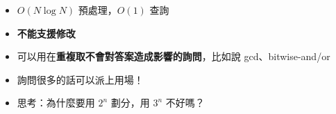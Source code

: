 \documentclass[standalone]{beamer}
\begin{document}
\begin{frame}[fragile]{}
  \begin{itemize}
    \item $O(N \log N)$ 預處理，$O(1)$ 查詢
    \item \textbf{不能支援修改}
    \item 可以用在\textbf{重複取不會對答案造成影響的詢問}，比如說 gcd、bitwise-and/or
    \item 詢問很多的話可以派上用場！
    \item 思考：為什麼要用 $2^n$ 劃分，用 $3^n$ 不好嗎？
  \end{itemize}
\end{frame}
\end{document}
